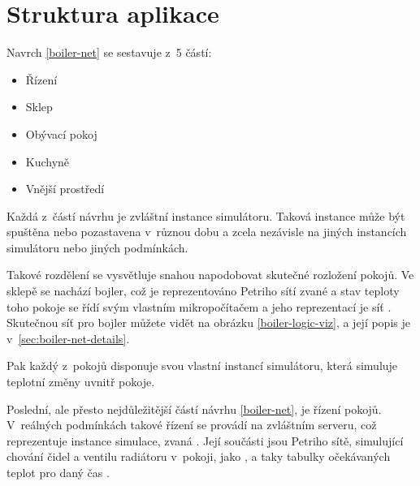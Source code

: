 \section{Struktura aplikace}

Navrch \ref{boiler-net} se sestavuje z~5 částí:
\begin{itemize}
 \item Řízení
 \item Sklep
 \item Obývací pokoj
 \item Kuchyně
 \item Vnější prostředí
\end{itemize}
Každá z~částí návrhu je zvláštní instance simulátoru. Taková instance může být spuštěna nebo pozastavena v~různou dobu a zcela nezávisle na jiných instancích simulátoru nebo jiných podmínkách.

Takové rozdělení se vysvětluje snahou napodobovat skutečné rozložení pokojů. Ve sklepě se nachází bojler, což je reprezentováno Petriho sítí zvané  a stav teploty toho pokoje se řídí svým vlastním mikropočítačem a jeho reprezentací je síť . Skutečnou síť pro bojler můžete vidět na obrázku \ref{boiler-logic-viz}, a její popis je v~\ref{sec:boiler-net-details}.

Pak každý z~pokojů disponuje svou vlastní instancí simulátoru, která simuluje teplotní změny uvnitř pokoje.

Poslední, ale přesto nejdůležitější částí návrhu \ref{boiler-net}, je řízení pokojů. V~reálných podmínkách takové řízení se provádí na zvláštním serveru, což reprezentuje instance simulace, zvaná . Její součásti jsou Petriho sítě, simulující chování čidel a ventilu radiátoru v~pokoji, jako , a taky tabulky očekávaných teplot pro daný čas .

